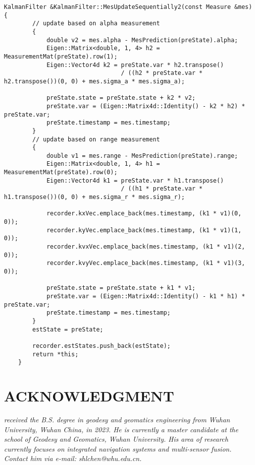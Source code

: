 \documentclass[12pt, onecolumn]{article}
\newcommand\normf{\fangsong}
\begin{document}
	\begin{lstlisting}[caption={\normf “逐次量测更新(先角度后距离)”算法实现}]
    KalmanFilter &KalmanFilter::MesUpdateSequentially2(const Measure &mes) {
        // update based on alpha measurement
        {
            double v2 = mes.alpha - MesPrediction(preState).alpha;
            Eigen::Matrix<double, 1, 4> h2 = MeasurementMat(preState).row(1);
            Eigen::Vector4d k2 = preState.var * h2.transpose()
                                 / ((h2 * preState.var * h2.transpose())(0, 0) + mes.sigma_a * mes.sigma_a);

            preState.state = preState.state + k2 * v2;
            preState.var = (Eigen::Matrix4d::Identity() - k2 * h2) * preState.var;
            preState.timestamp = mes.timestamp;
        }
        // update based on range measurement
        {
            double v1 = mes.range - MesPrediction(preState).range;
            Eigen::Matrix<double, 1, 4> h1 = MeasurementMat(preState).row(0);
            Eigen::Vector4d k1 = preState.var * h1.transpose()
                                 / ((h1 * preState.var * h1.transpose())(0, 0) + mes.sigma_r * mes.sigma_r);

            recorder.kxVec.emplace_back(mes.timestamp, (k1 * v1)(0, 0));
            recorder.kyVec.emplace_back(mes.timestamp, (k1 * v1)(1, 0));
            recorder.kvxVec.emplace_back(mes.timestamp, (k1 * v1)(2, 0));
            recorder.kvyVec.emplace_back(mes.timestamp, (k1 * v1)(3, 0));

            preState.state = preState.state + k1 * v1;
            preState.var = (Eigen::Matrix4d::Identity() - k1 * h1) * preState.var;
            preState.timestamp = mes.timestamp;
        }
        estState = preState;

        recorder.estStates.push_back(estState);
        return *this;
    }
	\end{lstlisting}
		
	\newpage
	\section{ACKNOWLEDGMENT}
	\begin{tcolorbox}[colback=white,colframe=white!70!black,title={\bfseries Author Information}]
	\par\noindent
		\parbox[t]{\linewidth}{
	 \noindent{}
	 \emph{
	 received the B.S. degree in geodesy and geomatics engineering from Wuhan University, Wuhan China, in 2023.
	 He is currently a master candidate at the school of Geodesy and Geomatics, Wuhan University. His area of research currently focuses on integrated navigation systems and multi-sensor fusion.
	 Contact him via e-mail: shlchen@whu.edu.cn.
	 }}
	\end{tcolorbox}
		
		
\end{document}
